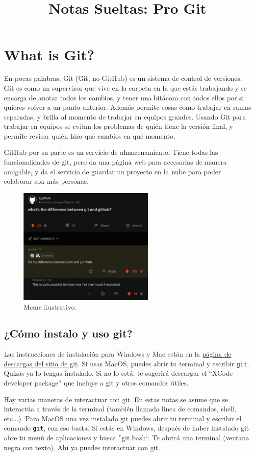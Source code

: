\documentclass[spanish, 12pt, a4paper]{article}
\title{Notas Sueltas: Pro Git}
\begin{document}
\section{What is Git?}
En pocas palabras, Git (Git, no GitHub) es un sistema de control de versiones. Git es como un supervisor que vive en la carpeta en la que estás trabajando y se encarga de anotar todos los cambios, y tener una bitácora con todos ellos por si quieres volver a un punto anterior. Además permite cosas como trabajar en ramas separadas, y brilla al momento de trabajar en equipos grandes.
Usando Git para trabajar en equipos se evitan los problemas de quién tiene la versión final, y permite revisar quién hizo qué cambios en qué momento.

GitHub por su parte es un servicio de almacenamiento. Tiene todas las funcionalidades de git, pero da una página web para accesarlas de manera amigable, y da el servicio de guardar un proyecto en la nube para poder colaborar con más personas.

\begin{figure}[h]
  \centering
  \includegraphics[width=0.6\textwidth]{figs/meme_git_v_gh.jpg}
  \caption{Meme ilustrativo.}
  \label{fig:lifecycle}
\end{figure}

\subsection{¿Cómo instalo y uso git?}
Las instrucciones de instalación para Windows y Mac están en la \href{https://git-scm.com/downloads}{página de descargas del sitio de git}.
Si usas MacOS, puedes abrir tu terminal y escribir \texttt{git}. Quizás ya lo tengas instalado. Si no lo está, te sugerirá descargar el ``XCode developer package'' que incluye a git y otros comandos útiles.

Hay varias maneras de interactuar con git. En estas notas se asume que se interactúa a través de la terminal (también llamada linea de comandos, shell, etc...). Para MacOS una vez instalado git puedes abrir tu terminal y escribir el comando \texttt{git}, con eso basta. Si estás en Windows, después de haber instalado git abre tu menú de aplicaciones y busca ''git bash``. Te abrirá una terminal (ventana negra con texto). Ahi ya puedes interactuar con git.
\end{document}
